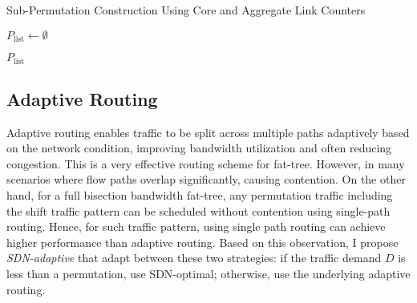 \begin{algorithm}[H]
\caption{Sub-Permutation Construction Using Core and Aggregate Link Counters}
\label{alg:sub_permutation}

$P_{\text{list}} \gets \emptyset$\;


\Return $P_{\text{list}}$\;
\end{algorithm}

\subsection{Adaptive Routing}

Adaptive routing enables traffic to be split across multiple paths adaptively
based on the network condition, improving bandwidth utilization and often
reducing congestion. This is a very effective routing scheme for fat-tree.
However, in many scenarios where flow paths overlap significantly, causing
contention. On the other hand, for a full bisection bandwidth fat-tree, any
permutation traffic including the shift traffic pattern can be scheduled
without contention using single-path routing. Hence, for such traffic pattern,
using single path routing can achieve higher performance than
adaptive routing. Based on this observation, I propose \textit{SDN-adaptive}
that adapt between these two strategies: if the traffic demand $D$ is
less than a permutation, use SDN-optimal; otherwise, use the underlying
adaptive routing.

